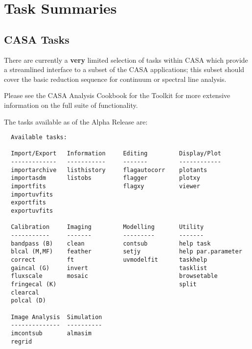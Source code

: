 


\chapter[Appendix: Task Summaries]{Task Summaries}
\label{chapter:tasks}

\section{CASA Tasks}
\label{section:tasks.list}

There are currently a {\bf very} limited selection of tasks within
CASA which provide a streamlined interface to a subset of the CASA
applications; this subset should cover the basic reduction sequence
for continuum or spectral line analysis.

Please see the CASA Analysis Cookbook for the Toolkit for more
extensive information on the full suite of functionality.

The tasks available as of the Alpha Release are: 

\small
\begin{verbatim}
  Available tasks: 

  Import/Export   Information     Editing         Display/Plot
  -------------   -----------     -------         ------------
  importarchive   listhistory     flagautocorr    plotants
  importasdm      listobs         flagger         plotxy 
  importfits                      flagxy          viewer
  importuvfits
  exportfits
  exportuvfits

  Calibration     Imaging         Modelling       Utility
  -----------     -------         ---------       -------
  bandpass (B)    clean           contsub         help task
  blcal (M,MF)    feather         setjy           help par.parameter
  correct         ft              uvmodelfit      taskhelp
  gaincal (G)     invert                          tasklist
  fluxscale       mosaic                          browsetable
  fringecal (K)                                   split
  clearcal
  polcal (D)

  Image Analysis  Simulation
  --------------  ----------
  imcontsub       almasim
  regrid
\end{verbatim}
\normalsize

